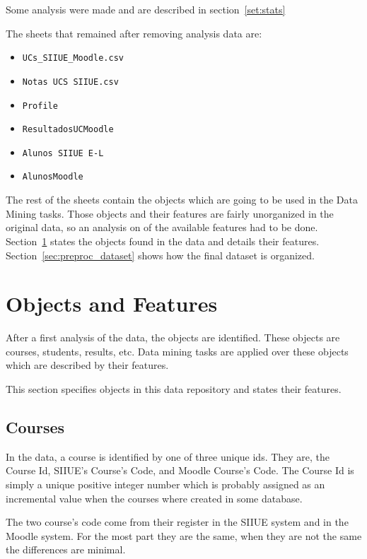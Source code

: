 Some analysis were made and are described in section~\ref{set:stats}

The sheets that remained after removing analysis data are:

\begin{itemize}
    \item \texttt{UCs\_SIIUE\_Moodle.csv}
    \item \texttt{Notas UCS SIIUE.csv}
    \item \texttt{Profile}
    \item \texttt{ResultadosUCMoodle}
    \item \texttt{Alunos SIIUE E-L}
    \item \texttt{AlunosMoodle}
\end{itemize}

The rest of the sheets contain the objects which are going to be used in the
Data Mining tasks. Those objects and their features are fairly unorganized in
the original data, so an analysis on of the available features had to be done.
Section~\ref{sec:objs_feat} states the objects found in the data and details
their features. Section~\ref{sec:preproc_dataset} shows how the final dataset
is organized.

\section{Objects and Features}
\label{sec:objs_feat}

After a first analysis of the data, the objects are identified. These objects
are courses, students, results, etc. Data mining tasks are applied over these
objects which are described by their features.

This section specifies objects in this data repository and states their
features.

\subsection{Courses}
\label{sec:data_courses}

In the data, a course is identified by one of three unique ids. They are, the
Course Id, SIIUE's Course's Code, and Moodle Course's Code. The Course Id is
simply a unique positive integer number which is probably assigned as an
incremental value when the courses where created in some database.

The two course's code come from their register in the SIIUE system and in the
Moodle system. For the most part they are the same, when they are not the same
the differences are minimal.

